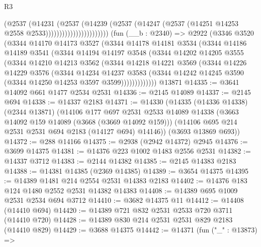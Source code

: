 \begin{lexlean}{R3}
\begin{coremodule}
                                  (@2537
                                    (@14231
                                      (@2537
                                        (@14239
                                          (@2537
                                            (@14247
                                              (@2537
                                                (@14251 @14253 @2558 @2533)))))))))))))))))))))))
    (fun (__b : @2340) =>
    @2922
      (@3346
        @3520
        (@3344
          @14170
          @14173
          @3527
          (@3344
            @14178
            @14181
            @3534
            (@3344
              @14186
              @14189
              @3541
              (@3344
                @14194
                @14197
                @3548
                (@3344
                  @14202
                  @14205
                  @3555
                  (@3344
                    @14210
                    @14213
                    @3562
                    (@3344
                      @14218
                      @14221
                      @3569
                      (@3344
                        @14226
                        @14229
                        @3576
                        (@3344
                          @14234
                          @14237
                          @3583
                          (@3344 @14242 @14245 @3590 (@3344 @14250 @14253 @3597 @3599)))))))))))))
    @13871
@14335 := @3641 @14092 @661 @1477 @2534 @2531
@14336 := @2145 @14089
@14337 := @2145 @694
@14338 := @14337 @2183
@14371 := @14330
    (@14335
      (@14336 @14338)
      (@2344 @13871)
      (@14106
        @177
        @697
        @2531
        @2533
        @14089
        @14338
        (@3663 @14092 @159 @14089 (@3668 (@3669 @14092 @159)))
        (@14106 @695 @214 @2531 @2531 @694 @2183 (@14127 @694) @14146))
      (@3693 @13869 @693))
@14372 := @288 @14166
@14375 := @2938 (@2942 @14372) @2945
@14376 := @3699 @14375
@14381 := @14376 @223 @1002 @1483 @2556 @2531
@14382 := @14337 @3712
@14383 := @2144 @14382
@14385 := @2145 @14383 @2183
@14388 := @14381 @14385 (@2369 @14385)
@14389 := @3654 @14375
@14395 := @14389 @1481 @214 @2554 @2531 @14383 @2183
@14402 := @14376 @183 @124 @1480 @2552 @2531 @14382 @14383
@14408 := @14389 @695 @1009 @2531 @2534 @694 @3712
@14410 := @3682 @14375 @11
@14412 := @14408 (@14410 @694)
@14420 := @14389 @721 @832 @2531 @2533 @720 @3711 (@14410 @720)
@14428 := @14389 @830 @214 @2531 @2531 @829 @2183 (@14410 @829)
@14429 := @3688 @14375
@14442 := @14371
    (fun ("_" : @13873) =>

\end{coremodule}
\end{lexlean}
